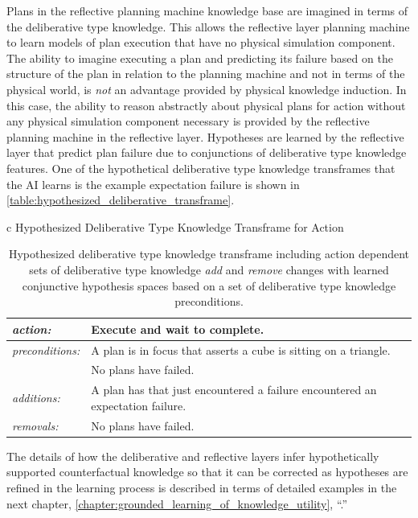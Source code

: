 Plans in the reflective planning machine knowledge base are imagined
in terms of the deliberative type knowledge.  This allows the
reflective layer planning machine to learn models of plan execution
that have no physical simulation component.  The ability to imagine
executing a plan and predicting its failure based on the structure of
the plan in relation to the planning machine and not in terms of the
physical world, is \emph{not} an advantage provided by physical
knowledge induction.  In this case, the ability to reason abstractly
about physical plans for action without any physical simulation
component necessary is provided by the reflective planning machine in
the reflective layer.  Hypotheses are learned by the reflective layer
that predict plan failure due to conjunctions of deliberative type
knowledge features.  One of the hypothetical deliberative type
knowledge transframes that the AI learns is the example expectation
failure is shown in
{\mbox{\autoref{table:hypothesized_deliberative_transframe}}}.
\begin{table}[h]
\centering
\begin{tabular}{c}
  Hypothesized Deliberative Type Knowledge Transframe for Action \\
  \begin{tabular}{|l|p{8cm}|}
    \hline
    \emph{action:}        & Execute and wait to complete. \\
    \hline
    \emph{preconditions:} & A plan is in focus that asserts a cube is sitting on a triangle. \\
    ~                     & No plans have failed. \\
    \hline
    \emph{additions:}     & A plan has that just encountered a failure encountered an expectation failure. \\
    \hline
    \emph{removals:}      & No plans have failed. \\
    \hline
  \end{tabular}
\end{tabular}
\caption[Hypothesized deliberative type knowledge transframe for
  action.]{Hypothesized deliberative type knowledge transframe
  including action dependent sets of deliberative type knowledge
  \emph{add} and \emph{remove} changes with learned conjunctive
  hypothesis spaces based on a set of deliberative type knowledge
  preconditions.}
\label{table:hypothesized_deliberative_transframe}
\end{table}

The details of how the deliberative and reflective layers infer
hypothetically supported counterfactual knowledge so that it can be
corrected as hypotheses are refined in the learning process is
described in terms of detailed examples in the next chapter,
\autoref{chapter:grounded_learning_of_knowledge_utility},
``.''
